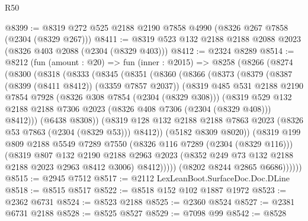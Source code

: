 \begin{lexlean}{R50}
\begin{coremodule}
@8399 := @8319 @272 @525 @2188 @2190 @7858 @4990 (@8326 @267 @7858 (@2304 (@8329 @267)))
@8411 := @8319 @523 @132 @2188 @2188 @2088 @2023 (@8326 @403 @2088 (@2304 (@8329 @403)))
@8412 := @2324 @8289
@8514 := @8212
    (fun (amount : @20) =>
    fun (inner : @2015) =>
    @8258
      (@8266
        (@8274
          (@8300
            (@8318
              (@8333
                (@8345
                  (@8351
                    (@8360
                      (@8366
                        (@8373
                          (@8379
                            (@8387 (@8399 (@8411 @8412)) (@3359 @7857 @2037))
                            (@8319
                              @485
                              @531
                              @2188
                              @2190
                              @7854
                              @7928
                              (@8326 @308 @7854 (@2304 (@8329 @308)))
                              (@8319
                                @529
                                @132
                                @2188
                                @2188
                                @7306
                                @2023
                                (@8326 @408 @7306 (@2304 (@8329 @408)))
                                @8412)))
                          (@6438 @8308))
                        (@8319
                          @128
                          @132
                          @2188
                          @2188
                          @7863
                          @2023
                          (@8326 @53 @7863 (@2304 (@8329 @53)))
                          @8412))
                      (@5182 @8309 @8020))
                    (@8319
                      @199
                      @809
                      @2188
                      @5549
                      @7289
                      @7550
                      (@8326 @116 @7289 (@2304 (@8329 @116)))
                      (@8319
                        @807
                        @132
                        @2190
                        @2188
                        @2963
                        @2023
                        (@8352 @249 @73 @132 @2188 @2188 @2023 @2963 @8412 @3006)
                        @8412)))))
              (@8202 @8244 @2865 @6686))))))
@8515 := @2945 @7512
@8517 := @2112 LexLeanBoot.SurfaceDoc.Doc.DLine
@8518 := @8515 @8517
@8522 := @8518 @152 @102 @1887 @1972
@8523 := @2362 @6731
@8524 := @8523 @2188
@8525 := @2360 @8524
@8527 := @2381 @6731 @2188
@8528 := @8525 @8527
@8529 := @7098 @99
@8542 := @8528

\end{coremodule}
\end{lexlean}
